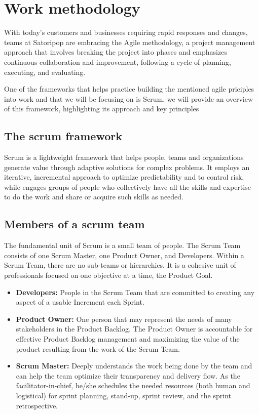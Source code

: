 \section{Work methodology}
With today’s customers and businesses requiring rapid responses and changes, teams at Satoripop are embracing 
the Agile methodology, a project management approach that involves breaking the project into phases 
and emphasizes continuous collaboration and improvement, following a cycle of planning, executing, 
and evaluating. 

One of the frameworks that helps practice building the mentioned agile priciples into work and that we will 
be focusing on is Scrum. we will provide an overview of this framework, highlighting its approach and 
key principles

\subsection{The scrum framework}
Scrum is a lightweight framework that helps people, teams and organizations generate value through adaptive 
solutions for complex problems. It employs an iterative, incremental approach to optimize predictability 
and to control risk, while engages groups of people who collectively have all the skills and expertise 
to do the work and share or acquire such skills as needed.

\subsection{Members of a scrum team }
The fundamental unit of Scrum is a small team of people. The Scrum Team consists of
one Scrum Master, one Product Owner, and Developers. Within a Scrum Team, there are no sub-teams
or hierarchies. It is a cohesive unit of professionals focused on one objective at a time, 
the Product Goal. \cite{scrumguides}

\begin{itemize}
    \item \textbf{Developers:} People in the Scrum Team that are committed to creating any aspect 
    of a usable Increment each Sprint.
    \item \textbf{Product Owner:} One person that may represent the needs of many stakeholders
    in the Product Backlog. The Product Owner is accountable for effective Product Backlog management 
    and maximizing the value of the product resulting from the work of the Scrum Team.
    \item \textbf{Scrum Master:} Deeply understands the work being done by the team and 
    can help the team optimize their transparency and delivery flow. As the facilitator-in-chief, 
    he/she schedules the needed resources (both human and logistical) for sprint planning, stand-up, 
    sprint review, and the sprint retrospective.
\end{itemize}
\raggedbottom

